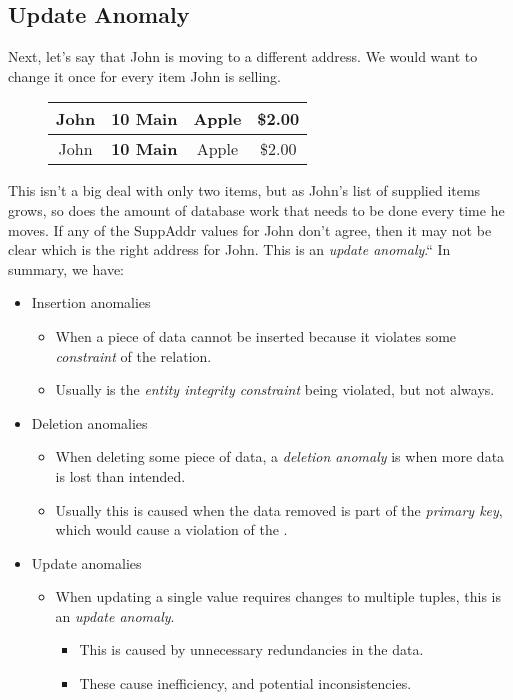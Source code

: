 \documentclass{report}
\begin{document}
\subsection*{Update Anomaly}
Next, let's say that John is moving to a different address. We would want to change it once for every item John is selling.
\begin{figure}[ht]
\centering
\setlength{\tabcolsep}{39}
\begin{tabular}{c c c c}
\hline
John & \textbf{10 Main} & Apple & \$2.00 \\
          \hline
John & \textbf{10 Main} & Apple & \$2.00 \\
\hline
          \end{tabular}
          \end{figure}
          \bigbreak \noindent
          This isn't a big deal with only two items, but as John's list of supplied items grows, so does the amount of database work that needs to be done every time he moves. If any of the SuppAddr values for John don't agree, then it may not be clear which is the right address for John. This is an \textit{update anomaly}.``
          \bigbreak \noindent
          In summary, we have:
          \begin{itemize}
              \item Insertion anomalies
                  \begin{itemize}[label=$\circ$]
                      \item When a piece of data cannot be inserted because it violates some \textit{constraint} of the relation.
                      \item Usually is the \textit{entity integrity constraint} being violated, but not always.
                  \end{itemize}
              \item Deletion anomalies
                  \begin{itemize}[label=$\circ$]
                      \item When deleting some piece of data, a \textit{deletion anomaly} is when more data is lost than intended.
                      \item Usually this is caused when the data removed is part of the \textit{primary key}, which would cause a violation of the .
                  \end{itemize}
              \item Update anomalies
                  \begin{itemize}[label=$\circ$]
                      \item When updating a single value requires changes to multiple tuples, this is an \textit{update anomaly}.
                          \begin{itemize}[label=$\circ$]
                            \item This is caused by unnecessary redundancies in the data. 
                            \item These cause inefficiency, and potential inconsistencies.
                          \end{itemize}
                  \end{itemize}
          \end{itemize}
\end{document}
